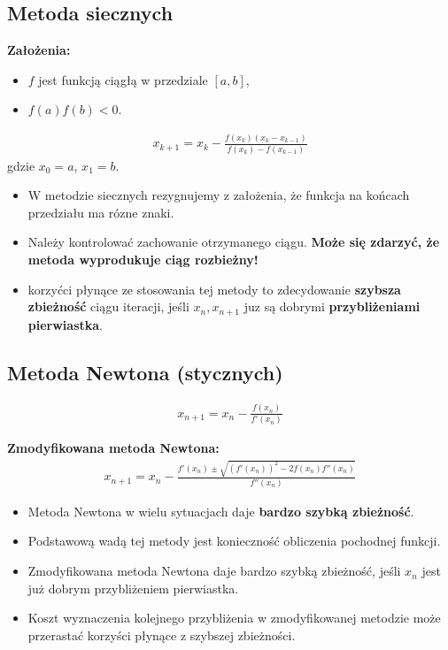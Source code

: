 \documentclass[12pt]{article}
\begin{document}
    \subsection{Metoda siecznych}

    \textbf{Założenia:}
    \begin{itemize}
        \item $f$ jest funkcją ciągłą w przedziale $[a,b]$,
        \item $f(a)f(b) < 0$.
    \end{itemize}

    \begin{align*}
        x_{k+1} = x_k - \frac{f(x_k)(x_k - x_{k-1})}{f(x_k) - f(x_{k-1})}
    \end{align*}
    gdzie $x_0 = a$, $x_1 = b$.

    \begin{itemize}
        \item W metodzie siecznych rezygnujemy z założenia, że funkcja na końcach przedziału ma rózne znaki.
        \item Należy kontrolować zachowanie otrzymanego ciągu. \textbf{Może się zdarzyć, że metoda wyprodukuje ciąg rozbieżny!}
        \item korzyćci płynące ze stosowania tej metody to zdecydowanie \textbf{szybsza zbieżność} ciągu iteracji, jeśli
        $x_n, x_{n+1}$ juz są dobrymi \textbf{przybliżeniami pierwiastka}.
    \end{itemize}

    \subsection{Metoda Newtona (stycznych)}

    \begin{align*}
        x_{n+1} = x_n - \frac{f(x_n)}{f'(x_n)}
    \end{align*}

    \textbf{Zmodyfikowana metoda Newtona:}
    \begin{align*}
        x_{n+1} = x_n - \frac{f'(x_n) \pm \sqrt{(f'(x_n))^2 - 2f(x_n)f''(x_n)}}{f''(x_n)}
    \end{align*}


    \begin{itemize}
        \item Metoda Newtona w wielu sytuacjach daje \textbf{bardzo szybką zbieżność}.
        \item Podstawową wadą tej metody jest konieczność obliczenia pochodnej funkcji.
        \item Zmodyfikowana metoda Newtona daje bardzo szybką zbieżność, jeśli $x_n$ jest już dobrym przybliżeniem
        pierwiastka.
        \item Koszt wyznaczenia kolejnego przybliżenia w zmodyfikowanej metodzie może przerastać korzyści płynące
        z szybszej zbieżności.
    \end{itemize}
\end{document}
